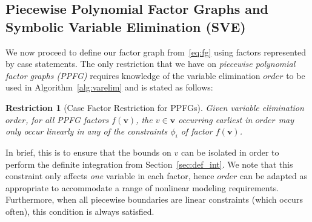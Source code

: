 \documentclass[letterpaper]{article}
\newtheorem{restr}{Restriction}   %
\renewcommand{\vec}[1]{\mathbf{#1}}
\begin{document}
{%





%


\subsection{Piecewise Polynomial Factor Graphs and Symbolic Variable Elimination (SVE)}

We now proceed
to define our factor graph from~\eqref{eq:fg} using factors
represented by case statements.  The only restriction that we have on
\emph{piecewise polynomial factor graphs (PPFG)} requires
knowledge of the variable elimination $\mathit{order}$ to be used in
Algorithm~\ref{alg:varelim} and is stated as follows: 
\begin{restr}[Case Factor Restriction for PPFGs]
Given
variable elimination $\mathit{order}$, for all PPFG factors
$f(\vec{v})$, the $v \in \vec{v}$ occurring earliest in
$\mathit{order}$ may only occur linearly in any of the constraints
$\phi_i$ of factor $f(\vec{v})$.
\end{restr}
\vspace{-2mm}
In brief, this is to ensure that the
bounds on $v$ can be isolated in order to perform the definite
integration from Section~\ref{sec:def_int}.  We note that this
constraint only affects \emph{one} variable in each factor, hence
$\mathit{order}$ can be adapted as appropriate to accommodate a range
of nonlinear modeling
requirements.  Furthermore, when all piecewise boundaries are
linear constraints (which occurs often), this condition is always
satisfied.

}
\end{document}
